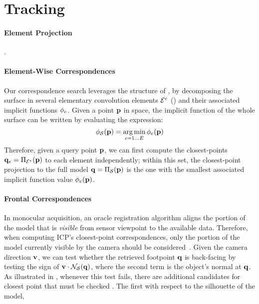 \section{Tracking}

\paragraph{Element Projection}
.

\paragraph{Element-Wise Correspondences}
Our correspondence search leverages the structure of , by decomposing the surface in several elementary convolution elements $\mathcal{E}^e$ () and their associated implicit functions $\phi_e$. Given a point $\mathbf{p}$ in space, the implicit function of the whole surface can be written by evaluating the expression:
\begin{equation}
\phi_{\mathcal{S}}(\mathbf{p}) = \operatorname*{arg\,min}_{e=1 \dots E} \phi_e(\mathbf{p})
\label{eq:piecewise}
\end{equation}
Therefore, given a query point $\mathbf{p}$, we can first compute the closest-points $\mathbf{q}_e = \Pi_{\mathcal{E}^e}(\mathbf{p})$ to each element independently; within this set, the closest-point projection to the full model $\mathbf{q} = \Pi_{\mathcal{S}}(\mathbf{p})$ is the one with the smallest associated implicit function value $\phi_e(\mathbf{p})$.


\paragraph{Frontal Correspondences}
In monocular acquisition, an oracle registration algorithm aligns the portion of the model that is \emph{visible} from sensor viewpoint to the available data. Therefore, when computing ICP's closest-point correspondences, only the portion of the model currently visible by the camera should be considered~\cite{tagliasacchi2015robust}. Given the camera direction $\mathbf{v}$, we can test whether the retrieved footpoint $\mathbf{q}$ is back-facing by testing the sign of $\mathbf{v} \cdot \mathcal{N}_{\mathcal{S}}(\mathbf{q})$, where the second term is the object's normal at $\mathbf{q}$. As illustrated in , whenever this test fails, there are additional candidates for closest point that must be checked . The first with respect to the silhouette of the model, 

